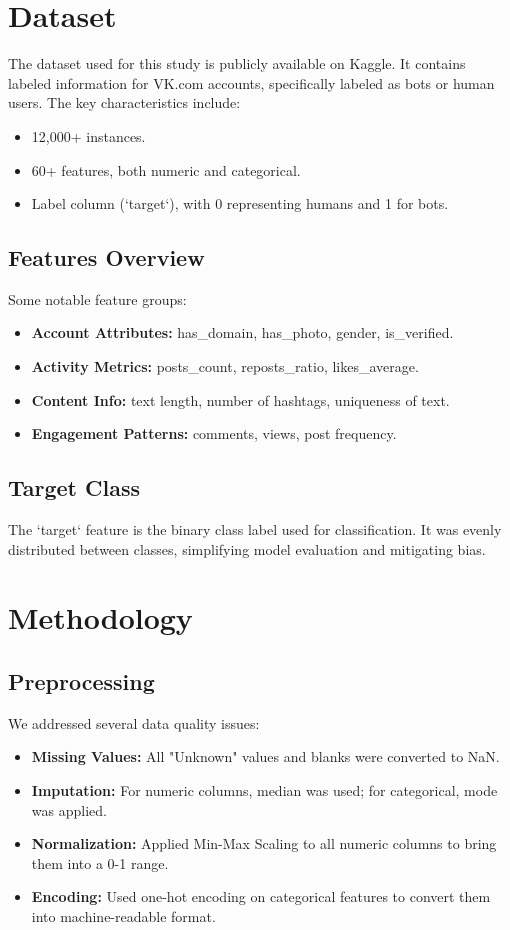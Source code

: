 \documentclass[conference]{IEEEtran}
\begin{document}
\section{Dataset}
The dataset used for this study is publicly available on Kaggle\cite{b1}. It contains labeled information for VK.com accounts, specifically labeled as bots or human users. The key characteristics include:

\begin{itemize}
    \item 12,000+ instances.
    \item 60+ features, both numeric and categorical.
    \item Label column (`target`), with 0 representing humans and 1 for bots.
\end{itemize}

\subsection{Features Overview}
Some notable feature groups:
\begin{itemize}
    \item \textbf{Account Attributes:} has\_domain, has\_photo, gender, is\_verified.
    \item \textbf{Activity Metrics:} posts\_count, reposts\_ratio, likes\_average.
    \item \textbf{Content Info:} text length, number of hashtags, uniqueness of text.
    \item \textbf{Engagement Patterns:} comments, views, post frequency.
\end{itemize}

\subsection{Target Class}
The `target` feature is the binary class label used for classification. It was evenly distributed between classes, simplifying model evaluation and mitigating bias.

\section{Methodology}
\subsection{Preprocessing}
We addressed several data quality issues:
\begin{itemize}
    \item \textbf{Missing Values:} All "Unknown" values and blanks were converted to NaN.
    \item \textbf{Imputation:} For numeric columns, median was used; for categorical, mode was applied.
    \item \textbf{Normalization:} Applied Min-Max Scaling to all numeric columns to bring them into a 0-1 range.
    \item \textbf{Encoding:} Used one-hot encoding on categorical features to convert them into machine-readable format.
\end{itemize}
\end{document}
